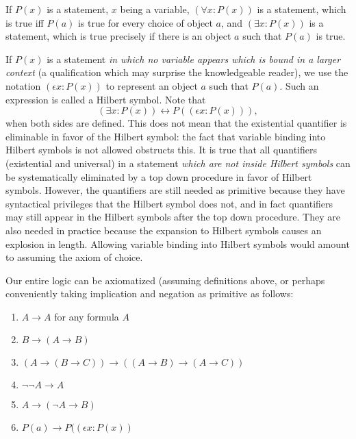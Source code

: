 \documentclass[12pt]{article}
\begin{document}
If $P(x)$ is a statement, $x$ being a variable, $(\forall x:P(x))$ is a statement, which is true iff $P(a)$ is true for every choice of object $a$,
and $(\exists x:P(x))$ is a statement, which is true precisely if there is an object $a$ such that $P(a)$ is true.

If $P(x)$ is a statement {\em in which no variable appears which is bound in a larger context\/} (a qualification which may surprise the knowledgeable reader), we use the notation $(\epsilon x:P(x))$ to represent an object $a$ such that $P(a)$.  Such an expression is called a Hilbert symbol.  Note that $$(\exists x:P(x)) \leftrightarrow P((\epsilon x:P(x))),$$  when both sides are defined.  This does not mean that the existential quantifier is eliminable in favor of the Hilbert symbol:  the fact that variable binding into Hilbert symbols is not allowed  obstructs this.  It is true that all quantifiers (existential and universal) in a statement {\em which are not inside Hilbert symbols\/} can be systematically eliminated by a top down procedure in favor of Hilbert symbols.  However, the quantifiers are still needed as primitive because they have syntactical privileges that the Hilbert symbol does not, and in fact quantifiers may still appear in the Hilbert symbols after the top down procedure. They are also needed in practice because the expansion to Hilbert symbols causes an explosion in length.  Allowing variable binding into Hilbert symbols would amount to assuming the axiom of choice.

Our entire logic can be axiomatized (assuming definitions above, or perhaps conveniently taking implication and negation as primitive as follows:

\begin{enumerate}

\item $A \rightarrow A$ for any formula $A$

\item $B \rightarrow (A \rightarrow B)$

\item $(A \rightarrow (B \rightarrow C)) \rightarrow ((A \rightarrow B) \rightarrow (A\rightarrow C))$

\item $\neg \neg A \rightarrow A$

\item $A \rightarrow (\neg A \rightarrow B)$

\item $P(a) \rightarrow P((\epsilon x:P(x))$

\end{enumerate}
\end{document}
